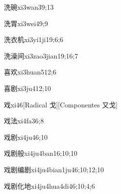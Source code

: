 \begin{verbete}{洗碗}{xi3wan3}{9;13}
\end{verbete}

\begin{verbete}{洗胃}{xi3wei4}{9;9}
\end{verbete}

\begin{verbete}{洗衣机}{xi3yi1ji1}{9;6;6}
\end{verbete}

\begin{verbete}{洗澡间}{xi3zao3jian1}{9;16;7}
\end{verbete}

\begin{verbete}{喜欢}{xi3huan5}{12;6}
\end{verbete}

\begin{verbete}{喜剧}{xi3ju4}{12;10}
\end{verbete}

\begin{verbete}{戏}{xi4}{6}[Radical 戈][Componentes 又戈]
\end{verbete}

\begin{verbete}{戏法}{xi4fa3}{6;8}
\end{verbete}

\begin{verbete}{戏剧}{xi4ju4}{6;10}
\end{verbete}

\begin{verbete}{戏剧般}{xi4ju4ban1}{6;10;10}
\end{verbete}

\begin{verbete}{戏剧编剧}{xi4ju4bian1ju4}{6;10;12;10}
\end{verbete}

\begin{verbete}{戏剧化地}{xi4ju4hua4di4}{6;10;4;6}
\end{verbete}


